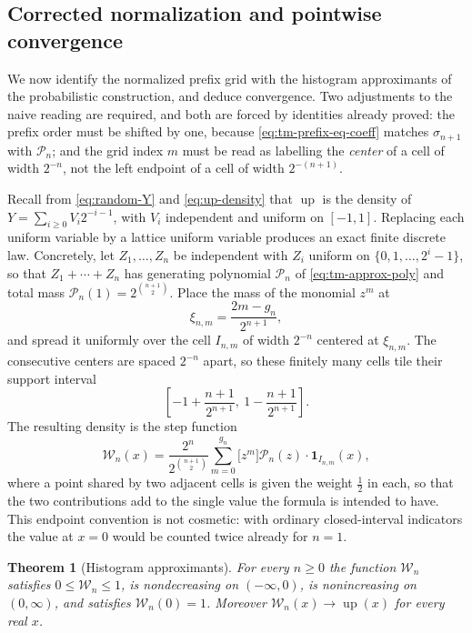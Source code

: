 \documentclass[11pt,oneside]{article}
\newtheorem{theorem}{Theorem}[section]
\theoremstyle{definition}
\theoremstyle{remark}
\newcommand{\Up}{\operatorname{up}}
\begin{document}
\subsection{Corrected normalization and pointwise convergence}
\label{tm:sub-corrected}

We now identify the normalized prefix grid with the histogram approximants of the
probabilistic construction, and deduce convergence.  Two adjustments to the naive reading
are required, and both are forced by identities already proved: the prefix order must be
shifted by one, because \eqref{eq:tm-prefix-eq-coeff} matches $\sigma_{n+1}$ with $\mathcal P_n$; and
the grid index $m$ must be read as labelling the \emph{center} of a cell of width $2^{-n}$,
not the left endpoint of a cell of width $2^{-(n+1)}$.

Recall from \eqref{eq:random-Y} and \eqref{eq:up-density} that $\Up$ is the density of
$Y=\sum_{i\ge0}V_i2^{-i-1}$, with $V_i$ independent and uniform on $[-1,1]$.  Replacing each
uniform variable by a lattice uniform variable produces an exact finite discrete law.
Concretely, let $Z_1,\ldots,Z_n$ be independent with $Z_i$ uniform on
$\{0,1,\ldots,2^i-1\}$, so that $Z_1+\cdots+Z_n$ has generating polynomial $\mathcal P_n$ of
\eqref{eq:tm-approx-poly} and total mass $\mathcal P_n(1)=2^{\binom{n+1}2}$.  Place the mass of the
monomial $z^m$ at
\begin{equation}
 \xi_{n,m}=\frac{2m-g_n}{2^{n+1}},                    \label{eq:tm-center}
\end{equation}
and spread it uniformly over the cell $I_{n,m}$ of width $2^{-n}$ centered at $\xi_{n,m}$.
The consecutive centers are spaced $2^{-n}$ apart, so these finitely many cells tile their
support interval
\[
 \left[-1+\frac{n+1}{2^{n+1}},\ 1-\frac{n+1}{2^{n+1}}\right].
\]
The resulting
density is the step function
\begin{equation}
 \mathcal W_n(x)=\frac{2^n}{2^{\binom{n+1}2}}
 \sum_{m=0}^{g_n}\bigl[z^m\bigr]\mathcal P_n(z)\cdot
 \mathbf 1_{I_{n,m}}(x),                                   \label{eq:tm-histogram}
\end{equation}
where a point shared by two adjacent cells is given the weight $\tfrac12$ in each, so that
the two contributions add to the single value the formula is intended to have.  This
endpoint convention is not cosmetic: with ordinary closed-interval indicators the value at
$x=0$ would be counted twice already for $n=1$.

\begin{theorem}[Histogram approximants]
\label{thm:tm-histogram-limit}
For every $n\ge0$ the function $\mathcal W_n$ satisfies $0\le\mathcal W_n\le1$, is nondecreasing on
$(-\infty,0)$, is nonincreasing on $(0,\infty)$, and satisfies $\mathcal W_n(0)=1$.  Moreover
$\mathcal W_n(x)\to\Up(x)$ for every real $x$.
\end{theorem}
\end{document}
